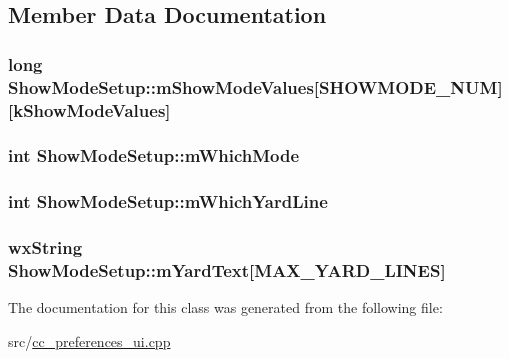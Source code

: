 \subsection{Member Data Documentation}
\hypertarget{a00141_a719647c3fd514a9221012f57e0a4462f}{
\subsubsection[{m\-Show\-Mode\-Values}]{\setlength{\rightskip}{0pt plus 5cm}long Show\-Mode\-Setup\-::m\-Show\-Mode\-Values\mbox{[}{\bf S\-H\-O\-W\-M\-O\-D\-E\-\_\-\-N\-U\-M}\mbox{]}\mbox{[}{\bf k\-Show\-Mode\-Values}\mbox{]}\hspace{0.3cm}{\ttfamily [private]}}}\label{a00141_a719647c3fd514a9221012f57e0a4462f}
\hypertarget{a00141_a8087962d62c3be79421a49d86c99bbec}{
\subsubsection[{m\-Which\-Mode}]{\setlength{\rightskip}{0pt plus 5cm}int Show\-Mode\-Setup\-::m\-Which\-Mode\hspace{0.3cm}{\ttfamily [private]}}}\label{a00141_a8087962d62c3be79421a49d86c99bbec}
\hypertarget{a00141_ab487eddeeb6cbb918b4e142aff3b8a42}{
\subsubsection[{m\-Which\-Yard\-Line}]{\setlength{\rightskip}{0pt plus 5cm}int Show\-Mode\-Setup\-::m\-Which\-Yard\-Line\hspace{0.3cm}{\ttfamily [private]}}}\label{a00141_ab487eddeeb6cbb918b4e142aff3b8a42}
\hypertarget{a00141_a6f32e0bc34daf76831f10a6074411c82}{
\subsubsection[{m\-Yard\-Text}]{\setlength{\rightskip}{0pt plus 5cm}wx\-String Show\-Mode\-Setup\-::m\-Yard\-Text\mbox{[}{\bf M\-A\-X\-\_\-\-Y\-A\-R\-D\-\_\-\-L\-I\-N\-E\-S}\mbox{]}\hspace{0.3cm}{\ttfamily [private]}}}\label{a00141_a6f32e0bc34daf76831f10a6074411c82}


The documentation for this class was generated from the following file\-:\begin{DoxyCompactItemize}
\item 
src/\hyperlink{a00187}{cc\-\_\-preferences\-\_\-ui.\-cpp}\end{DoxyCompactItemize}
